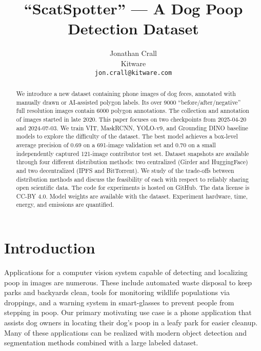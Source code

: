 \documentclass{article}
\title{``ScatSpotter'' --- A Dog Poop Detection Dataset}
\author{Jonathan Crall\\
Kitware\\
\texttt{jon.crall@kitware.com} \\
}
\begin{document}
\maketitle


\begin{abstract}


We introduce a new dataset containing phone images of dog feces, annotated with manually drawn or AI-assisted polygon labels.  Its over 9000 ``before/after/negative'' full resolution images contain 6000 polygon annotations.  The collection and annotation of images started in late 2020.  This paper focuses on two checkpoints from 2025-04-20 and 2024-07-03.  We train VIT, MaskRCNN, YOLO-v9, and Grounding DINO baseline models to explore the difficulty of the dataset.  The best model achieves a box-level average precision of 0.69 on a 691-image validation set and 0.70 on a small independently captured 121-image contributor test set.  Dataset snapshots are available through four different distribution methods: two centralized (Girder and HuggingFace) and two decentralized (IPFS and BitTorrent).  We study of the trade-offs between distribution methods and discuss the feasibility of each with respect to reliably sharing open scientific data.  The code for experiments is hosted on GitHub.  The data license is CC-BY 4.0.  Model weights are available with the dataset.  Experiment hardware, time, energy, and emissions are quantified.


\end{abstract}

\section{Introduction}
\label{sec:intro}

Applications for a computer vision system capable of detecting and localizing poop in images are numerous.
These include automated waste disposal to keep parks and backyards clean, tools for monitoring wildlife
  populations via droppings, and a warning system in smart-glasses to prevent people from stepping in poop.
Our primary motivating use case is a phone application that assists dog owners in locating their dog's poop
  in a leafy park for easier cleanup.
Many of these applications can be realized with modern object detection and segmentation methods
  \cite{sandler_mobilenetv2_2018, siam_rtseg_2018, yu_mobilenet_yolo_2023} combined with a large labeled
  dataset. 
\end{document}
